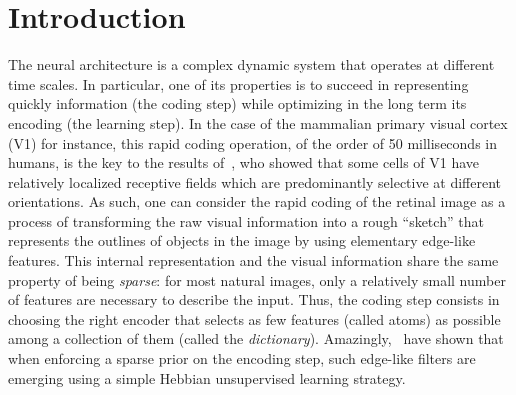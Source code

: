 \documentclass[draft]{article} %
\title{\Title}
\author{%
\FirstNameA\ \AuthorA \and \FirstNameB\ \AuthorB \and \FirstNameC\ \AuthorC
}
\date{\Institute\ \\
\Organism\
}
\newcommand{\Abstract}{ %
The formation of structure in the brain, that is, of the connections between cells within neural populations, is by large an unsupervised learning process: the emergence of this architecture is mostly self-organized. In the primary visual cortex of mammals, for example, one may observe during development the formation of cells selective to localized, oriented features. This leads to the development of a rough representation of contours of the retinal image in area V1. We modeled these mechanisms using sparse Hebbian learning algorithms. These algorithms alternate a coding step to encode the information with a learning step to find the proper encoder. A major difficulty faced by these algorithms is to deduce a good representation while knowing immature encoders, and to learn good encoders with a non-optimal representation. To address this problem, we propose to introduce a new regulation process between learning and coding, called homeostasis. Our homeostasis is compatible with a neuro-mimetic architecture and allows for the fast emergence of localized filters sensitive to orientation. The key to this algorithm lies in a simple adaptation mechanism based on non-linear functions that reconciles the antagonistic processes that occur at the coding and learning time scales. We tested this unsupervised algorithm with this homeostasis rule for a range of existing unsupervised learning algorithms coupled with different neural coding algorithms. In addition, we propose a simplification of this optimal homeostasis rule by implementing a simple heuristic on the probability of activation of neurons. Compared to the optimal homeostasis rule, we show that this heuristic allows to implement a more rapid unsupervised learning algorithm while keeping a large part of its effectiveness. These results demonstrate the potential application of such a strategy in machine learning and we illustrate this with one result in a convolutional neural network.
}
\begin{document}
%
\maketitle
\begin{abstract}
\Abstract
\end{abstract}
%
%
\thispagestyle{empty}
\section{Introduction}\label{introduction}
The neural architecture is a complex dynamic system that operates at different time scales. In particular, one of its properties is to succeed in representing quickly information (the coding step) while optimizing in the long term its encoding (the learning step). In the case of the mammalian primary visual cortex (V1) for instance, this rapid coding operation, of the order of 50 milliseconds in humans, is the key to the results of~\citet{Hubel68}, who showed that some cells of V1 have relatively localized receptive fields which are predominantly selective at different orientations. As such, one can consider the rapid coding of the retinal image as a process of transforming the raw visual information into a rough ``sketch'' that represents the outlines of objects in the image by using elementary edge-like features. This internal representation and the visual information share the same property of being \emph{sparse}: for most natural images, only a relatively small number of features are necessary to describe the input. Thus, the coding step consists in choosing the right encoder that selects as few features (called atoms) as possible among a collection of them (called the \emph{dictionary}). Amazingly,~\citet{Olshausen96} have shown that when enforcing a sparse prior on the encoding step, such edge-like filters are emerging using a simple Hebbian unsupervised learning strategy. %
\end{document}
